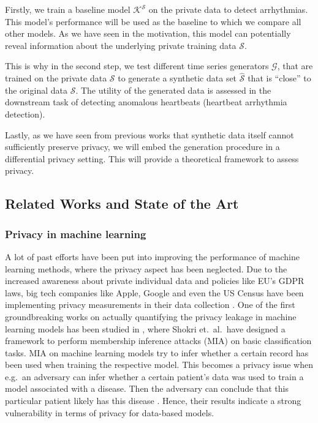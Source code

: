 Firstly, we train a baseline model \(\mathcal{K}^\mathcal{S}\) on the private data to detect arrhythmias. This model's performance will be used as the baseline to which we compare all other models. As we have seen in the motivation, this model can potentially reveal information about the underlying private training data $\mathcal{S}$.

This is why in the second step, we test different time series generators $\mathcal{G}$, that are trained on the private data $\mathcal{S}$ to generate a synthetic data set $\widehat{\mathcal{S}}$ that is ``close'' to the original data $\mathcal{S}$. The utility of the generated data is assessed in the downstream task of detecting anomalous heartbeats (heartbeat arrhythmia detection). 

Lastly, as we have seen from previous works that synthetic data itself cannot sufficiently preserve privacy, we will embed the generation procedure in a differential privacy setting. This will provide a theoretical framework to assess privacy.

\subsection{Related Works and State of the Art}

\subsubsection*{Privacy in machine learning}
A lot of past efforts have been put into improving the performance of machine learning methods, where the privacy aspect has been neglected. Due to the increased awareness about private individual data and policies like EU's GDPR laws, big tech companies like Apple, Google and even the US Census have been implementing privacy measurements in their data collection \parencite[see][]{dwork2019differential,abowd2019census}. One of the first groundbreaking works on actually quantifying the privacy leakage in machine learning models has been studied in \parencite{shokri2017membership}, where Shokri et.\ al.\ have designed a framework to perform membership inference attacks (MIA) on basic classification tasks. MIA on machine learning models try to infer whether a certain record has been used when training the respective model. This becomes a privacy issue when e.g.\ an adversary can infer whether a certain patient's data was used to train a model associated with a disease. Then the adversary can conclude that this particular patient likely has this disease \parencite[cf.][p. 5]{shokri2017membership}. Hence, their results indicate a strong vulnerability in terms of privacy for data-based models.


